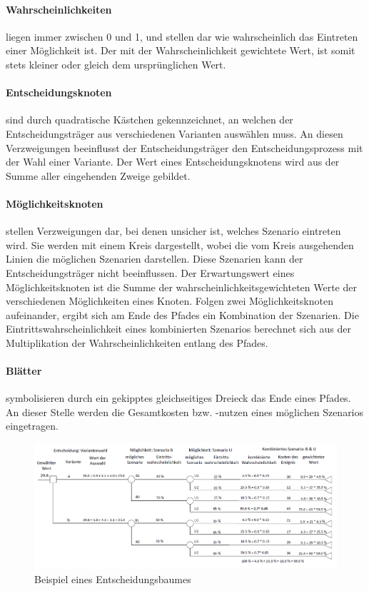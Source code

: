 \paragraph{Wahrscheinlichkeiten} liegen immer zwischen 0 und 1, und stellen dar wie wahrscheinlich das Eintreten einer Möglichkeit ist. Der mit der Wahrscheinlichkeit gewichtete Wert, ist somit stets kleiner oder gleich dem ursprünglichen Wert. 

\paragraph{Entscheidungsknoten} sind durch quadratische Kästchen gekennzeichnet, an welchen der Entscheidungsträger aus verschiedenen Varianten auswählen muss. An diesen Verzweigungen beeinflusst der Entscheidungsträger den Entscheidungsprozess mit der Wahl einer Variante. Der Wert eines Entscheidungsknotens wird aus der Summe aller eingehenden Zweige gebildet.

\paragraph{Möglichkeitsknoten} stellen Verzweigungen dar, bei denen unsicher ist, welches Szenario eintreten wird. Sie werden mit einem Kreis dargestellt, wobei die vom Kreis ausgehenden Linien die möglichen Szenarien darstellen. Diese Szenarien kann der Entscheidungsträger nicht beeinflussen. 
Der Erwartungswert eines Möglichkeitsknoten ist die Summe der wahrscheinlichkeitsgewichteten Werte der verschiedenen Möglichkeiten eines Knoten. Folgen zwei Möglichkeitsknoten aufeinander, ergibt sich am Ende des Pfades ein Kombination der Szenarien. Die Eintrittswahrscheinlichkeit eines kombinierten Szenarios berechnet sich aus der Multiplikation der Wahrscheinlichkeiten entlang des Pfades. 

\paragraph{Blätter} symbolisieren durch ein gekipptes gleichseitiges Dreieck das Ende eines Pfades. An dieser Stelle werden die Gesamtkosten bzw. -nutzen eines möglichen Szenarios eingetragen.

\pagebreak

\begin{figure}[h!]
	\centering
	\includegraphics[width=\textwidth]{figures/f-02-02-EntscheidungsbaumBSP}
	\caption[Beispiel Entscheidungsbaum]{Beispiel eines Entscheidungsbaumes}
	\label{img:EntscheidungBSP}
\end{figure}

